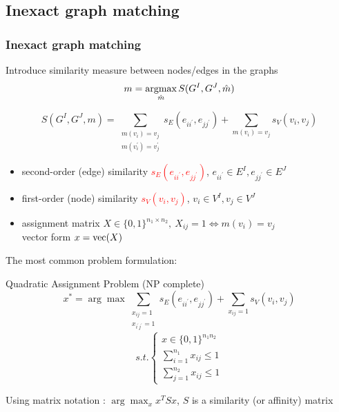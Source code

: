 \documentclass[hyperref={pdfpagelabels=false}]{beamer}
\def\vec{\mathop{\rm vec}}								%
\def\argmax{\mathop{\rm argmax}}						%
\begin{document}
\subsection{Inexact graph matching}
\begin{frame} [allowframebreaks]
\frametitle{Inexact graph matching}
Introduce similarity measure between nodes/edges in the graphs
\begin{equation*}
m = \argmax_{\hat{m}}S(G^I, G^J, \hat{m})
\end{equation*}

\begin{equation*}
	S(G^I,G^J,m)=\sum_{\substack{m(v_i)=v_j\\m(v_i^{\prime})=v_j^{\prime}}}s_E(e_{ii^\prime},e_{jj^\prime}) + \sum_{m(v_i)=v_j}s_V(v_{i},v_{j})
\end{equation*}

\begin{itemize}
\item second-order (edge) similarity \textcolor{red}{$s_E(e_{ii^\prime},e_{jj^\prime})$}, $e_{ii^\prime}\in E^I, e_{jj^\prime}\in E^J$
\item first-order (node) similarity \textcolor{red}{$s_V(v_{i},v_{j})$}, $v_i\in V^I, v_j\in V^J$
\item assignment matrix $X\in\{0,1\}^{n_1\times n_2},\ X_{ij}=1\iff m(v_i)=v_j$ \\
      vector form $x = \vec(X)$
\end{itemize}

\framebreak
The most common problem formulation:
\begin{block}{Quadratic Assignment Problem (NP complete)~{\tiny\citep{Burkard98thequadratic}}}
$$x^* = \arg\max \sum_{\substack{x_{ij}=1\\x_{i^\prime j^\prime}=1}}s_E(e_{ii^\prime},e_{jj^\prime}) + \sum_{x_{ij}=1}s_V(v_{i},v_{j}) $$
$$ s.t. \begin{cases}
		x\in\{0,1\}^{n_1n_2} \\
		\sum_{i=1}^{n_1}x_{ij}\le 1 \\
		\sum_{j=1}^{n_2}x_{ij}\le 1
\end{cases}$$
\end{block}
Using matrix notation : $\arg\max_{x}{x^TSx}$, $S$ is a similarity (or affinity) matrix


\framebreak


\end{frame}
\end{document}
